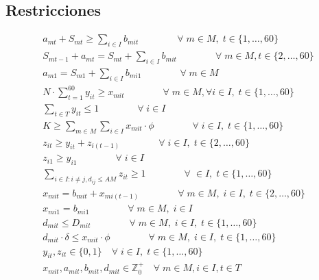 \documentclass[letterpaper]{article}
\begin{document}
\begin{flushleft}
		\subsection{Restricciones}
		\begin{gather}
			a_{mt} + S_{mt} \geq \sum_{i \in I} b_{mit} \qquad\qquad \forall \; m \in M, \; t \in \{1, \ldots, 60\}\\
			S_{mt-1} + a_{mt} = S_{mt} + \sum_{i \in I} b_{mit} \qquad\qquad \forall \; m \in M, t \in \{2, \ldots, 60\}\\
			a_{m1} = S_{m1} + \sum_{i \in I} b_{mi1}  \qquad\qquad \forall \; m \in M\\
			N \cdot \sum_{t=1}^{60} y_{it} \geq x_{mit} \qquad\qquad \forall \; m \in M, \forall i \in I,\; t \in \{1, \ldots, 60\}\\
			\sum_{t \in T} y_{it} \leq 1 \qquad\qquad \forall \; i \in I\\
			K \geq \sum_{m \in M} \sum_{i \in I} x_{mit} \cdot \phi \qquad\qquad \forall \; i \in I, \; t \in \{1, \ldots, 60\}\\
			z_{it} \geq y_{it} + z_{i(t-1)} \qquad\qquad \forall \; i \in I, \;t \in \{2, \ldots, 60\}\\
			z_{i1} \geq y_{i1} \qquad\qquad \forall \; i \in I\\
			\sum_{i \in I: i \neq j, d_{ij}\leq AM} z_{it} \geq 1 \qquad\qquad \forall \; \in I, \; t \in \{1, \ldots, 60\}\\
			x_{mit} = b_{mit} + x_{mi(t-1)} \qquad\qquad \forall \; m \in M, \; i \in I, \; t \in \{2, \ldots, 60\}\\
			x_{mi1} = b_{mi1} \qquad\qquad \forall \; m \in M, \; i \in I\\
			d_{mit} \leq D_{mit} \qquad\qquad \forall \; m \in M, \; i \in I, \; t \in \{1, \ldots, 60\}\\
			d_{mit} \cdot \delta \leq x_{mit} \cdot \phi \qquad\qquad \forall \; m \in M, \; i \in I, \; t \in \{1, \ldots, 60\}\\
			y_{it}, z_{it} \in \{0, 1\} \quad \forall \; i \in I, \; t \in \{1, \ldots, 60\}\\
			x_{mit}, a_{mit}, b_{mit}, d_{mit} \in \mathbb{Z}^{+}_0 \quad \forall \; m\in M, i\in I, t\in T\\
		\end{gather}


\end{flushleft}
\end{document}
